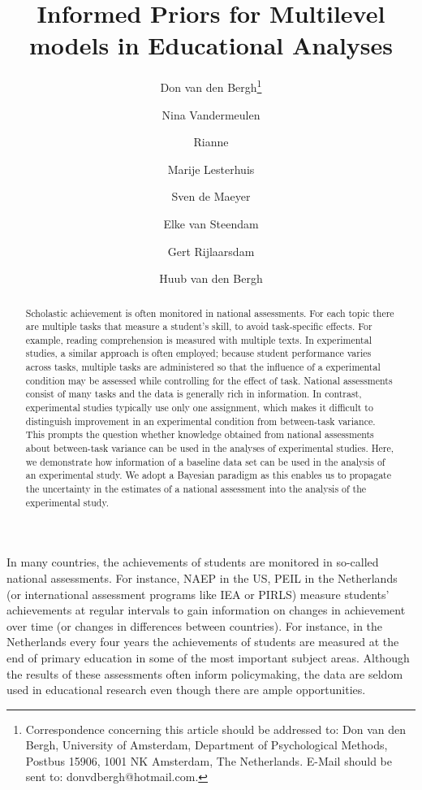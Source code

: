 \documentclass[a4paper]{article}
\author[1]{Don van den Bergh\thanks{Correspondence concerning this article should be addressed to:  
Don van den Bergh, University of Amsterdam, Department of Psychological Methods, Postbus 15906, 1001 NK Amsterdam, The Netherlands. E-Mail should be sent to: donvdbergh@hotmail.com.}}
\author[2]{Nina Vandermeulen}
\author[2]{Rianne}
\author[2]{Marije Lesterhuis}
\author[2]{Sven de Maeyer}
\author[2]{Elke van Steendam}
\author[2]{Gert Rijlaarsdam}
\author[3]{Huub van den Bergh}
\affil[1]{University of Amsterdam}
\affil[2]{University of Antwerp}
\affil[3]{University of Utrecht}
\title{Informed Priors for Multilevel models in Educational Analyses}
\date{}
\renewcommand{\thefootnote}{\fnsymbol{footnote}}
\begin{document}
\listoftodos
\newpage
\maketitle
\renewcommand{\thefootnote}{\arabic{footnote}}

\begin{abstract}
    Scholastic achievement is often monitored in national assessments. For each topic there are multiple tasks that measure a student's skill, to avoid task-specific effects. For example, reading comprehension is measured with multiple texts. In experimental studies, a similar approach is often employed; because student performance varies across tasks, multiple tasks are administered so that the influence of a experimental condition may be assessed while controlling for the effect of task. National assessments consist of many tasks and the data is generally rich in information. In contrast, experimental studies typically use only one assignment, which makes it difficult to distinguish improvement in an experimental condition from between-task variance. This prompts the question whether knowledge obtained from national assessments about between-task variance can be used in the analyses of experimental studies. Here, we demonstrate how information of a baseline data set can be used in the analysis of an experimental study. We adopt a Bayesian paradigm as this enables us to propagate the uncertainty in the estimates of a national assessment into the analysis of the experimental study.
\end{abstract}
\newpage


In many countries, the achievements of students are monitored in so-called national assessments. For instance, NAEP in the US, PEIL in the Netherlands (or international assessment programs like IEA or PIRLS) measure students' achievements at regular intervals to gain information on changes in achievement over time (or changes in differences between countries). For instance, in the Netherlands every four years the achievements of students are measured at the end of primary education in some of the most important subject areas. Although the results of these assessments often inform policymaking, the data are seldom used in educational research even though there are ample opportunities.
\end{document}
